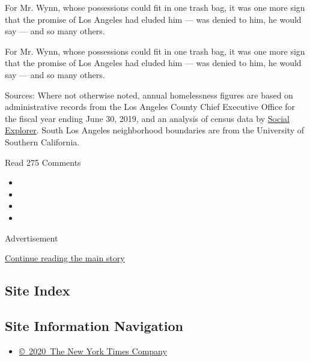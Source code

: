  For Mr. Wynn, whose possessions could fit in one trash bag, it was one
more sign that the promise of Los Angeles had eluded him --- was denied
to him, he would say --- and so many others.

 For Mr. Wynn, whose possessions could fit in one trash bag, it was one
more sign that the promise of Los Angeles had eluded him --- was denied
to him, he would say --- and so many others.

Sources: Where not otherwise noted, annual homelessness figures are
based on administrative records from the Los Angeles County Chief
Executive Office for the fiscal year ending June 30, 2019, and an
analysis of census data by \href{https://www.socialexplorer.com/}{Social
Explorer}. South Los Angeles neighborhood boundaries are from the
University of Southern California.

Read 275 Comments

\begin{itemize}
\item
\item
\item
\item
\end{itemize}

Advertisement

\protect\hyperlink{after-bottom}{Continue reading the main story}

\hypertarget{site-index}{%
\subsection{Site Index}\label{site-index}}

\hypertarget{site-information-navigation}{%
\subsection{Site Information
Navigation}\label{site-information-navigation}}

\begin{itemize}
\tightlist
\item
  \href{https://help.nytimes3xbfgragh.onion/hc/en-us/articles/115014792127-Copyright-notice}{©~2020~The
  New York Times Company}
\end{itemize}


